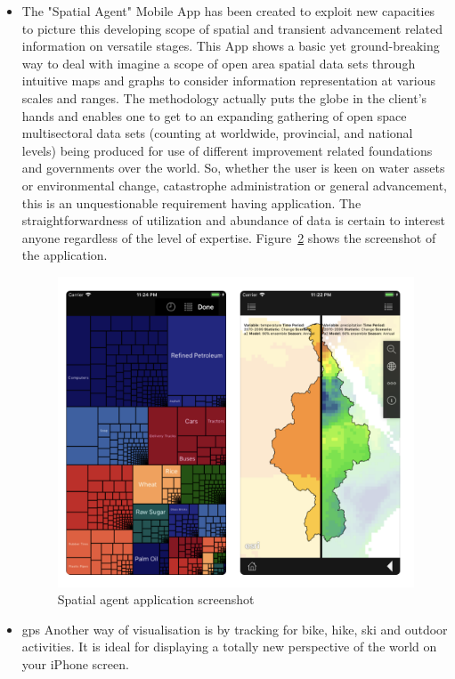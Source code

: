 \begin{itemize}
\begin{figure}[!htb]
\begin{minipage}{0.35\textwidth}
            \caption{Mobile data collection application screenshot - 2 \cite{GIS_cloud_mobile_data_collection}}\label{Fig:mobile_data_collection_2}
        \end{minipage}
\end{figure}

  
  \item The "Spatial Agent" Mobile App has been created to exploit new capacities to picture this developing scope of spatial and transient advancement related information on versatile stages. This App shows a basic yet ground-breaking way to deal with imagine a scope of open area spatial data sets through intuitive maps and graphs to consider information representation at various scales and ranges. The methodology actually puts the globe in the client's hands and enables one to get to an expanding gathering of open space multisectoral data sets (counting at worldwide, provincial, and national levels) being produced for use of different improvement related foundations and governments over the world. So, whether the user is keen on water assets or environmental change, catastrophe administration or general advancement, this is an unquestionable requirement having application. The straightforwardness of utilization and abundance of data is certain to interest anyone regardless of the level of expertise. Figure~\ref{fig:spatial_agent} shows the screenshot of the application. \cite{Spatial_Agent}

  \begin{figure}[H]
            \centering
            \includegraphics[width=0.5\linewidth]{figures/ch1/spatial_agent.png}
            \caption{\label{fig:spatial_agent} Spatial agent application screenshot \cite{Spatial_Agent}}
    \end{figure}
  
  \item \gls{gps} Another way of visualisation is by tracking for bike, hike, ski and outdoor activities. It is ideal for displaying a totally new perspective of the world on your iPhone screen.
  

\end{itemize}

